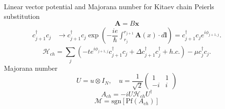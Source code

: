\documentclass[xcolor=dvipsnames,10pt,aspectratio=169]{beamer}
\renewcommand{\vec}[1]{\mathbf{#1}}
\newcommand{\ham}{\mathcal{H}}
\newcommand{\cc}{c^{\dagger}}
\newcommand{\de}{\Delta}
\begin{document}
  \begin{frame}{Linear vector potential and Majorana number for Kitaev chain}
    Peierls substitution
    \begin{equation}
      \vec{A} = B\vec{x}
    \end{equation}
    \begin{align}
      \cc_{j+1} c_j &\rightarrow \cc_{j+1} c_j \exp \left(-\dfrac{i e}{\hbar} \int_{r_j}^{r_{j+1}} \vec{A}(x) \cdot d\vec{l} \right) = \cc_{j+1} c_j e^{i \phi_{j+1,j}}.
    \end{align}
    \begin{equation} \label{eq: Peierls chain}
      \ham_{ch} = \sum_j (-t e^{i\phi_{j+1,j}} \cc_{j+1} c_j + \de \cc_{j+1}\cc_j + h.c.) - \mu \cc_j c_j.
    \end{equation}
    Majorana number
    \begin{equation}
      U = u \otimes I_N,\quad u = \dfrac{1}{\sqrt{2}} \left(
      \begin{matrix}
        1 & 1 \\
        -i & i
    \end{matrix} \right)
    \end{equation}
    \begin{equation}
      A_{ch} = -iU\ham_{ch}U^\dagger
    \end{equation}
    \begin{equation}
      \mathcal{M} = \text{sgn}[\text{Pf}(A_{ch})]
    \end{equation}
  \end{frame}
\end{document}
